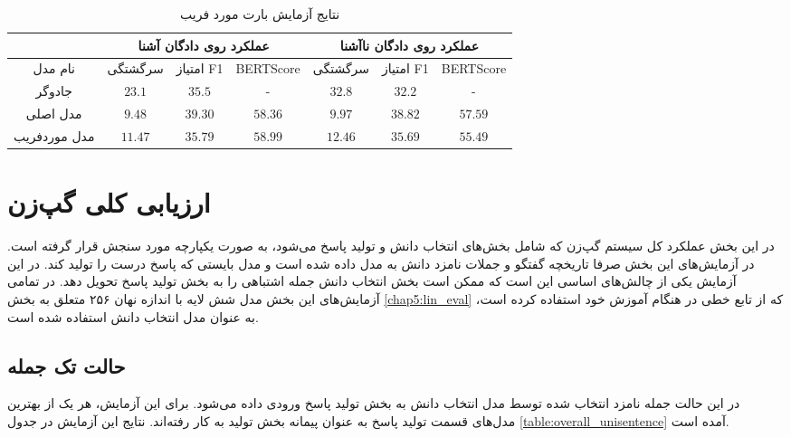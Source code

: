 \begin{table}[h]
	\caption{نتایج آزمایش بارت مورد فریب}
	\label{table:bart_deceive}
	\begin{tabular}{|c|c|c|c|c|c|c|}
		\hline
		& \multicolumn{3}{c|}{عملکرد روی دادگان آشنا}           & \multicolumn{3}{c|}{عملکرد روی دادگان نا‌آشنا}        \\ \hline
		نام مدل      & سرگشتگی         & امتیاز F1        & BERTScore        & سرگشتگی         & امتیاز F1        & BERTScore        \\ \hline
		جادوگر       & $23.1$          & $35.5$           & -                & $32.8$          & $32.2$           & -                \\ \hline
		مدل اصلی     & $\mathbf{9.48}$ & $\mathbf{39.30}$ & $58.36$          & $\mathbf{9.97}$ & $\mathbf{38.82}$ & $\mathbf{57.59}$ \\ \hline
		مدل موردفریب & $11.47$         & $35.79$          & $\mathbf{58.99}$ & $12.46$         & $35.69$          & $55.49$          \\ \hline
	\end{tabular}
\end{table}


\section{ارزیابی کلی گپ‌زن}
در این بخش عملکرد کل سیستم گپ‌زن که شامل بخش‌های انتخاب دانش و تولید پاسخ می‌شود، به صورت یکپارچه مورد سنجش قرار گرفته است. در آزمایش‌های این بخش صرفا تاریخچه گفتگو و جملات نامزد دانش به مدل داده شده است و مدل بایستی که پاسخ درست را تولید کند. در این آزمایش یکی از چالش‌های اساسی این است که ممکن است بخش انتخاب دانش جمله اشتباهی را به بخش تولید پاسخ تحویل دهد. در تمامی آزمایش‌های این بخش مدل شش لایه با اندازه نهان ۲۵۶ متعلق به بخش 
\ref{chap5:lin_eval}
که از تابع خطی در هنگام آموزش خود استفاده کرده است،‌ به عنوان مدل انتخاب دانش استفاده شده است.

\subsection{حالت تک جمله}
در این حالت جمله نامزد انتخاب شده توسط مدل انتخاب دانش به بخش تولید پاسخ ورودی داده می‌شود. برای این آزمایش، هر یک از بهترین مدل‌های قسمت تولید پاسخ به عنوان پیمانه بخش تولید به کار رفته‌اند. نتایج این آزمایش در جدول 
 \ref{table:overall_unisentence} 
آمده است.

